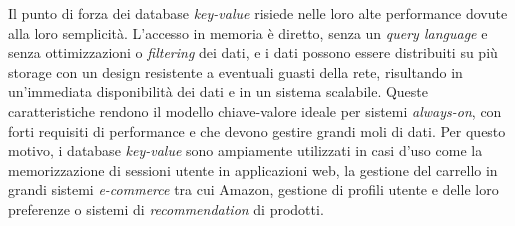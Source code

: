 Il punto di forza dei database \textit{key-value} risiede nelle loro alte performance dovute alla loro semplicità. L'accesso in memoria è diretto, senza un \textit{query language} e senza ottimizzazioni o \textit{filtering} dei dati, e i dati possono essere distribuiti su più storage con un design resistente a eventuali guasti della rete, risultando in un'immediata disponibilità dei dati e in un sistema scalabile. Queste caratteristiche rendono il modello chiave-valore ideale per sistemi \textit{always-on}, con forti requisiti di performance e che devono gestire grandi moli di dati. Per questo motivo, i database \textit{key-value} sono ampiamente utilizzati in casi d'uso come la memorizzazione di sessioni utente in applicazioni web, la gestione del carrello in grandi sistemi \textit{e-commerce} tra cui Amazon, gestione di profili utente e delle loro preferenze o sistemi di \textit{recommendation} di prodotti.





